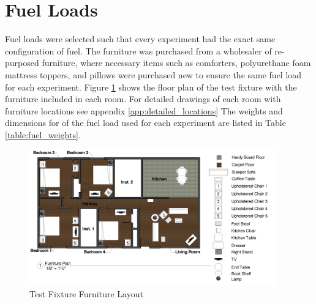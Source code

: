 \documentclass[12pt,oneside]{book}
\begin{document}
\section{Fuel Loads}
Fuel loads were selected such that every experiment had the exact same configuration of fuel. The furniture was purchased from a wholesaler of re-purposed furniture, where necessary items such as comforters, polyurethane foam mattress toppers, and pillows were purchased new to ensure the same fuel load for each experiment. Figure \ref{fig:furniture_layout} shows the floor plan of the test fixture with the furniture included in each room. For detailed drawings of each room with furniture locations see appendix \ref{app:detailed_locations} The weights and dimensions for of the fuel load used for each experiment are listed in Table \ref{table:fuel_weights}.

\begin{figure}[H]
\centering
\includegraphics[width=0.95\textwidth]{0_Images/Instrumentation/Furniture_Plan.png}
\caption{Test Fixture Furniture Layout}
\label{fig:furniture_layout}
\end{figure}
\end{document}
